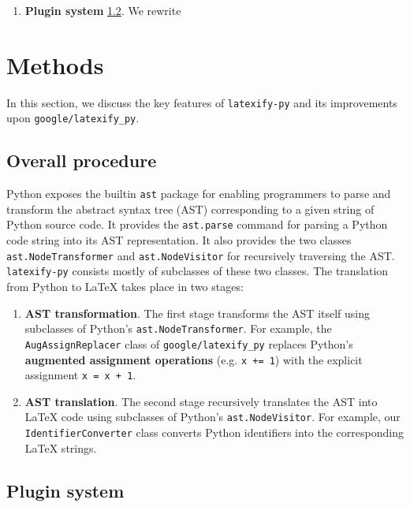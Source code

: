 \documentclass{article}
\newcommand{\ourpkg}{\texttt{latexify-py}}
\newcommand{\theirpkg}{\texttt{google/latexify\_py}}
\newcommand{\vocab}[1]{\textbf{#1}}
\begin{document}
\begin{enumerate}
    \item \vocab{Plugin system} \ref{sec:plugins}. We rewrite 
\end{enumerate}


\section{Methods}

In this section,
we discuss the key features of \ourpkg{}
and its improvements upon \theirpkg{}.

\subsection{Overall procedure}

Python exposes the builtin \verb|ast| package for enabling programmers to parse and transform the abstract syntax tree (AST) corresponding to a given string of Python source code.
It provides the \verb|ast.parse| command for parsing a Python code string into its AST representation.
It also provides the two classes \verb|ast.NodeTransformer| and \verb|ast.NodeVisitor| for recursively traversing the AST.
\ourpkg{} consists mostly of subclasses of these two classes.
The translation from Python to \LaTeX{} takes place in two stages:

\begin{enumerate}

    \item \vocab{AST transformation}.
        The first stage transforms the AST itself using subclasses of Python's \verb|ast.NodeTransformer|.
        For example, the \verb|AugAssignReplacer| class of \theirpkg{} replaces Python's \vocab{augmented assignment operations} (e.g. \verb|x += 1|) with the explicit assignment \verb|x = x + 1|.

    \item \vocab{AST translation}.
        The second stage recursively translates the AST into \LaTeX{} code using subclasses of Python's \verb|ast.NodeVisitor|.
        For example, our \verb|IdentifierConverter| class converts Python identifiers into the corresponding LaTeX strings.

\end{enumerate}





\subsection{Plugin system}
\label{sec:plugins}
\end{document}
